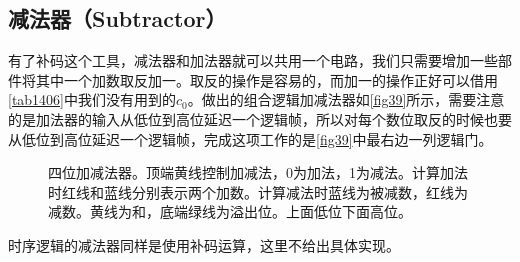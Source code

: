 \subsection{减法器（Subtractor）}
有了补码这个工具，减法器和加法器就可以共用一个电路，我们只需要增加一些部件将其中一个加数取反加一。取反的操作是容易的，而加一的操作正好可以借用\autoref{tab1406}中我们没有用到的$c_0$。做出的组合逻辑加减法器如\autoref{fig39}所示，需要注意的是加法器的输入从低位到高位延迟一个逻辑帧，所以对每个数位取反的时候也要从低位到高位延迟一个逻辑帧，完成这项工作的是\autoref{fig39}中最右边一列逻辑门。

\begin{figure}[!ht]
  \centering
  \caption{四位加减法器。顶端黄线控制加减法，0为加法，1为减法。计算加法时红线和蓝线分别表示两个加数。计算减法时蓝线为被减数，红线为减数。黄线为和，底端绿线为溢出位。上面低位下面高位。}\label{fig39}
\end{figure}

时序逻辑的减法器同样是使用补码运算，这里不给出具体实现。

